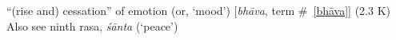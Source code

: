 \documentclass[10pt]{article}
\begin{document}
\begin{multicols}{2}
\begin{enumerate}[
			leftmargin=0em,
			rightmargin=0em,
		]
		 ``(rise and) cessation'' of emotion (or, `mood') [\textit{bhāva}, term \#~\ref{bhāva}] (2.3 K) Also see ninth rasa, \textit{śānta} (`peace')


\end{enumerate}
\end{multicols}
\end{document}
